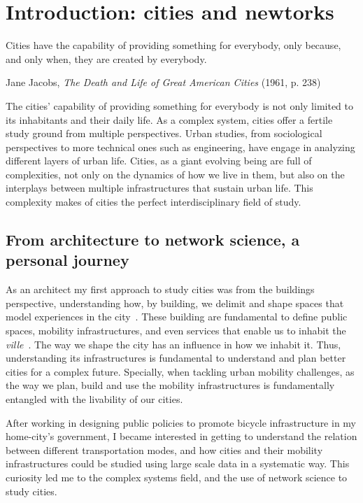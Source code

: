 \chapter{Introduction: cities and newtorks}

\epigraph{Cities have the capability of providing something for everybody, only because, and only when, they are created by everybody.}{Jane Jacobs, \textit{The Death and Life of Great American Cities} (1961, p. 238)}

The cities' capability of providing something for everybody is not only limited to its inhabitants and their daily life. As a complex system, cities offer a fertile study ground from multiple perspectives. Urban studies, from sociological perspectives to more technical ones such as engineering, have engage in analyzing different layers of urban life. Cities, as a giant evolving being are full of complexities, not only on the dynamics of how we live in them, but also on the interplays between multiple infrastructures that sustain urban life. This complexity makes of cities the perfect interdisciplinary field of study.

\section{From architecture to network science, a personal journey}

As an architect my first approach to study cities was from the buildings perspective, understanding how, by building, we delimit and shape spaces that model experiences in the city~\cite{ghel1971life}. These building are fundamental to define public spaces, mobility infrastructures, and even services that enable us to inhabit the \textit{ville}~\cite{sennett2018building}. The way we shape the city has an influence in how we inhabit it. Thus, understanding its infrastructures is fundamental to understand and plan better cities for a complex future. Specially, when tackling urban mobility challenges, as the way we plan, build and use the mobility infrastructures is fundamentally entangled with the livability of our cities.

After working in designing public policies to promote bicycle infrastructure in my home-city's government, I became interested in getting to understand the relation between different transportation modes, and how cities and their mobility infrastructures could be studied using large scale data in a systematic way. This curiosity led me to the complex systems field, and the use of network science to study cities.

